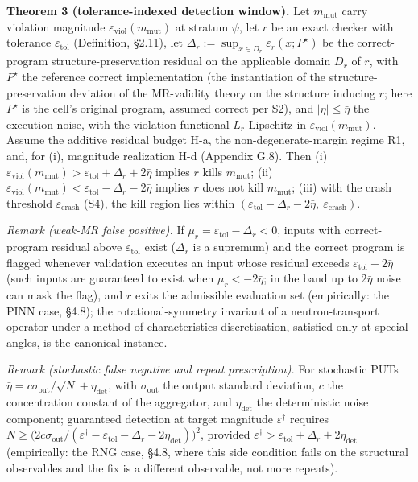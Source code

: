 \documentclass[manuscript,screen,review]{acmart}
\begin{document}
\textbf{Theorem 3 (tolerance-indexed detection window).} Let
$m_{\mathrm{mut}}$ carry violation magnitude
$\varepsilon_{\mathrm{viol}}(m_{\mathrm{mut}})$ at stratum $\psi$, let $r$
be an exact checker with tolerance $\varepsilon_{\mathrm{tol}}$
(Definition, §2.11), let
$\Delta_r:=\sup_{x\in D_r}\varepsilon_r(x;P^\star)$ be the
correct-program structure-preservation residual on the applicable domain
$D_r$ of $r$, with $P^\star$ the reference correct implementation (the
instantiation of the structure-preservation deviation of the MR-validity
theory on the structure inducing $r$; here $P^\star$ is the cell's
original program, assumed correct per S2), and $|\eta|\le\bar\eta$ the
execution noise, with the violation functional $L_r$-Lipschitz in
$\varepsilon_{\mathrm{viol}}(m_{\mathrm{mut}})$. Assume the additive
residual budget H-a, the non-degenerate-margin regime R1, and, for (i),
magnitude realization H-d (Appendix G.8). Then (i)
$\varepsilon_{\mathrm{viol}}(m_{\mathrm{mut}})>\varepsilon_{\mathrm{tol}}+\Delta_r+2\bar\eta$
implies $r$ kills $m_{\mathrm{mut}}$; (ii)
$\varepsilon_{\mathrm{viol}}(m_{\mathrm{mut}})<\varepsilon_{\mathrm{tol}}-\Delta_r-2\bar\eta$
implies $r$ does not kill $m_{\mathrm{mut}}$; (iii) with the crash
threshold $\varepsilon_{\mathrm{crash}}$ (S4), the kill region lies
within
$(\varepsilon_{\mathrm{tol}}-\Delta_r-2\bar\eta,\ \varepsilon_{\mathrm{crash}})$.

\emph{Remark (weak-MR false positive).} If
$\mu_r=\varepsilon_{\mathrm{tol}}-\Delta_r<0$, inputs with
correct-program residual above $\varepsilon_{\mathrm{tol}}$ exist
($\Delta_r$ is a supremum) and the correct program is flagged whenever
validation executes an input whose residual exceeds
$\varepsilon_{\mathrm{tol}}+2\bar\eta$ (such inputs are guaranteed to
exist when $\mu_r<-2\bar\eta$; in the band up to $2\bar\eta$ noise can
mask the flag), and $r$ exits the admissible evaluation set
(empirically: the PINN case, §4.8); the rotational-symmetry invariant of a
neutron-transport operator under a method-of-characteristics
discretisation, satisfied only at special angles, is the canonical
instance.

\emph{Remark (stochastic false negative and repeat prescription).} For
stochastic PUTs
$\bar\eta=c\sigma_{\mathrm{out}}/\sqrt N+\eta_{\mathrm{det}}$, with
$\sigma_{\mathrm{out}}$ the output standard deviation, $c$ the
concentration constant of the aggregator, and $\eta_{\mathrm{det}}$ the
deterministic noise component; guaranteed detection at target magnitude
$\varepsilon^\dagger$ requires
$N\ge\bigl(2c\sigma_{\mathrm{out}}/(\varepsilon^\dagger-\varepsilon_{\mathrm{tol}}-\Delta_r-2\eta_{\mathrm{det}})\bigr)^2$,
provided
$\varepsilon^\dagger>\varepsilon_{\mathrm{tol}}+\Delta_r+2\eta_{\mathrm{det}}$
(empirically: the RNG case, §4.8, where this side condition fails on the
structural observables and the fix is a different observable, not more
repeats).
\end{document}
